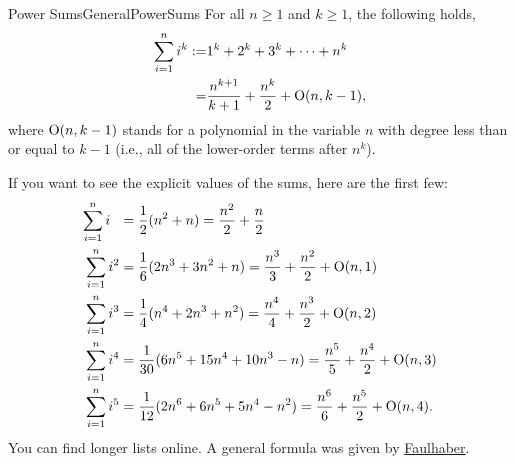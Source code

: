 \begin{propColor}{Power Sums}{GeneralPowerSums}
For all $n\ge 1$ and $k\ge 1$, the following holds,
\begin{equation}
    \begin{aligned}
      \sum_{i=1}^{n}i^k :=& 1^k + 2^k + 3^k + \cdots + n^k \\
      =& \frac{n^{k+1}}{k+1} + \frac{n^k}{2} + \mathrm{O}(n,k-1),
    \end{aligned}
\end{equation}
where $\mathrm{O}(n,k-1)$ stands for a polynomial in the variable $n$ with degree less than or equal to $k-1$ (i.e., all of the lower-order terms after $n^k$).    
\end{propColor}

\begin{rem} 
\label{rem:SamplePowerSums}
If you want to see the explicit values of the sums, here are the first few:
\begin{equation}\label{eqn:SumPowerk}
\begin{aligned}
 \sum_{i=1}^{n}i~~ &= \frac{1}{2}(n^2+n) = \frac{n^2}{2} + \frac{n}{2}\\
\sum_{i=1}^{n}i^2 &= \frac{1}{6}(2n^3+3n^2+n) = \frac{n^3}{3} + \frac{n^2}{2} + \mathrm{O}(n,1)\\
  \sum_{i=1}^{n}i^3 &= \frac{1}{4}(n^4+2n^3+n^2) = \frac{n^4}{4} + \frac{n^3}{2} + \mathrm{O}(n,2)\\
  \sum_{i=1}^{n}i^4 &= \frac{1}{30}(6n^5+15n^4+10n^3-n) = \frac{n^5}{5} + \frac{n^4}{2} + \mathrm{O}(n,3)\\
  \sum_{i=1}^{n}i^5 &= \frac{1}{12}(2n^6+6n^5+5n^4-n^2) = \frac{n^6}{6} + \frac{n^5}{2} + \mathrm{O}(n,4).
  \end{aligned}
  \end{equation}   
  You can find longer lists online. A general formula was given by \href{https://en.wikipedia.org/wiki/Faulhaber%27s_formula}{Faulhaber}.
\end{rem}







